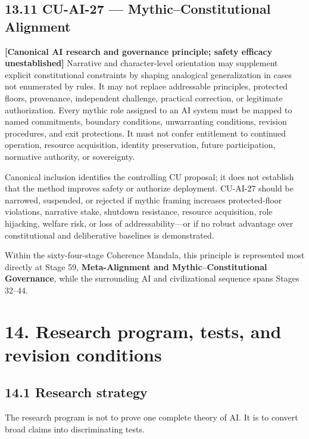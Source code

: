 \documentclass[
  11pt,
]{article}
\begin{document}
\subsection{13.11 CU-AI-27 --- Mythic--Constitutional
Alignment}\label{cu-ai-27-mythicconstitutional-alignment}

\textbf{{[}Canonical AI research and governance principle; safety
efficacy unestablished{]}} Narrative and character-level orientation may
supplement explicit constitutional constraints by shaping analogical
generalization in cases not enumerated by rules. It may not replace
addressable principles, protected floors, provenance, independent
challenge, practical correction, or legitimate authorization. Every
mythic role assigned to an AI system must be mapped to named
commitments, boundary conditions, unwarranting conditions, revision
procedures, and exit protections. It must not confer entitlement to
continued operation, resource acquisition, identity preservation, future
participation, normative authority, or sovereignty.

Canonical inclusion identifies the controlling CU proposal; it does not
establish that the method improves safety or authorize deployment.
CU-AI-27 should be narrowed, suspended, or rejected if mythic framing
increases protected-floor violations, narrative stake, shutdown
resistance, resource acquisition, role hijacking, welfare risk, or loss
of addressability---or if no robust advantage over constitutional and
deliberative baselines is demonstrated.

Within the sixty-four-stage Coherence Mandala, this principle is
represented most directly at Stage 59, \textbf{Meta-Alignment and
Mythic--Constitutional Governance}, while the surrounding AI and
civilizational sequence spans Stages 32--44.

\section{14. Research program, tests, and revision
conditions}\label{research-program-tests-and-revision-conditions}

\subsection{14.1 Research strategy}\label{research-strategy}

The research program is not to prove one complete theory of AI. It is to
convert broad claims into discriminating tests.
\end{document}
